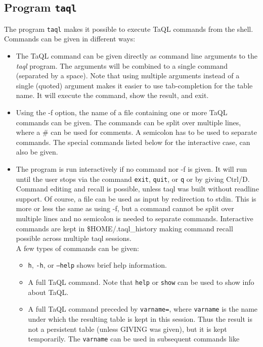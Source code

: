 \subsection{Program \texttt{taql}}
  The program \texttt{taql} makes it possible to execute TaQL commands
  from the shell. Commands can be given in different ways:
  \begin {itemize}
  \item The TaQL command can be given directly as command line
    arguments to the {\em taql}
    program. The arguments will be combined to a single command
    (separated by a space). Note
    that using multiple arguments instead of a single (quoted)
    argument makes it easier to use tab-completion for the
    table name.
    It will execute the command, show the result, and exit.
  \item Using the -f option, the name of a file containing one or more TaQL
    commands can be given. The commands can be split over multiple
    lines, where a \# can be used for comments. A semicolon has to be
    used to separate commands. The special commands listed below
    for the interactive case, can also be given.
  \item The program is run interactively if no command nor -f is given.
    It will run until the user stops via the  command \texttt{exit},
    \texttt{quit}, or \texttt{q} or by giving Ctrl/D. Command editing
    and recall is possible, unless taql was built without readline
    support. Of course, a file can be used as input by redirection to stdin. This is
    more or less the same as using -f, but a command cannot be split
    over multiple lines and no semicolon is needed to separate commands.
    Interactive commands are kept in \$HOME/.taql\_history making
    command recall possible across multiple taql sessions.
    \\A few types of commands can be given:
    \begin{itemize}
    \item \texttt{h}, \texttt{-h}, or \texttt{--help} shows brief help information.
    \item A full TaQL command. Note that \texttt{help} or
      \texttt{show} can be used to show info about TaQL.
    \item A full TaQL command preceded by \texttt{varname=}, where
      \texttt{varname} is the name under which the resulting table is
      kept in this session. Thus the result is not a persistent table
      (unless GIVING was given), but it is kept temporarily.
      The \texttt{varname} can be used in subsequent commands like

\end{itemize}
\end{itemize}
